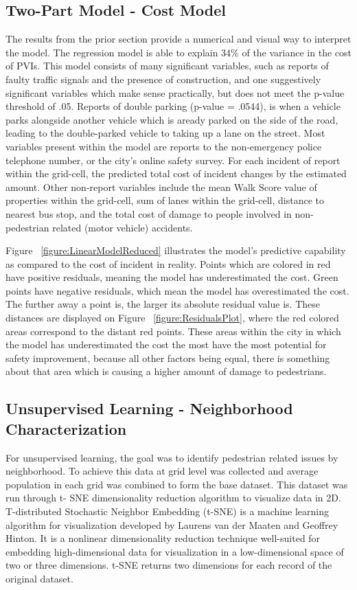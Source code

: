 \documentclass{llncs}
\begin{document}
\subsection{Two-Part Model - Cost Model}
The results from the prior section provide a numerical and visual way to interpret the model. The regression model is able to explain 34\% of the variance in the cost of PVIs. This model consists of many significant variables, such as reports of faulty traffic signals and  the presence of construction, and one suggestively significant variables which make sense practically, but does not meet the p-value threshold of .05. Reports of double parking (p-value = .0544), is when a vehicle parks alongside another vehicle which is aready parked on the side of the road, leading to the double-parked vehicle to taking up a lane on the street. Most variables present within the model are reports to the non-emergency police telephone number, or the city’s online safety survey. For each incident of report within the grid-cell, the predicted total cost of incident changes by the estimated amount. Other non-report variables include the mean Walk Score value of properties within the grid-cell, sum of lanes within the grid-cell, distance to nearest bus stop, and the total cost of damage to people involved in non-pedestrian related (motor vehicle) accidents. 

Figure ~\ref{figure:LinearModelReduced} illustrates the model’s predictive capability as compared to the cost of incident in reality. Points which are colored in red have positive residuals, meaning the model has underestimated the cost. Green points have negative residuals, which mean the model has overestimated the cost. The further away a point is, the larger its absolute residual value is. These distances are displayed on Figure ~\ref{figure:ResidualsPlot}, where the red colored areas correspond to the distant red points. These areas within the city in which the model has underestimated the cost the most have the most potential for safety improvement, because all other factors being equal, there is something about that area which is causing a higher amount of damage to pedestrians.

\subsection{Unsupervised Learning - Neighborhood Characterization}
For unsupervised learning, the goal was to identify pedestrian related issues by neighborhood. To achieve this data at grid level was collected and average population in each grid was combined to form the base dataset. This dataset was run through t- SNE dimensionality reduction algorithm to visualize data in 2D. T-distributed Stochastic Neighbor Embedding (t-SNE) \cite{tsne} is a machine learning algorithm for visualization developed by Laurens van der Maaten and Geoffrey Hinton. It is a nonlinear dimensionality reduction technique well-suited for embedding high-dimensional data for visualization in a low-dimensional space of two or three dimensions. t-SNE returns two dimensions for each record of the original dataset. 
\end{document}
